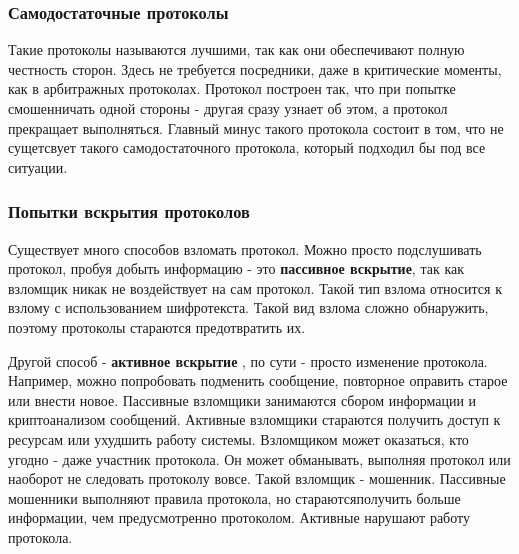 \documentclass[a4paper]{article}
\begin{document}
\subsubsection*{Самодостаточные протоколы}
Такие протоколы называются лучшими, так как они обеспечивают полную честность сторон. Здесь не требуется посредники, даже в критические моменты, как в арбитражных протоколах. Протокол построен так, что при попытке смошенничать одной стороны - другая сразу узнает об этом, а протокол прекращает выполняться.
Главный минус такого протокола состоит в том, что не сущетсвует такого самодостаточного протокола, который подходил бы под все ситуации. 
\subsubsection*{Попытки вскрытия протоколов}
Существует много способов взломать протокол. Можно просто подслушивать протокол, пробуя добыть информацию - это \textbf{пассивное вскрытие}, так как взломщик никак не воздействует на сам протокол.
Такой тип взлома относится к взлому с использованием шифротекста. Такой вид взлома сложно обнаружить, поэтому протоколы стараются предотвратить их.

Другой способ - \textbf{активное вскрытие }, по сути - просто изменение протокола. Например, можно попробовать подменить сообщение, повторное оправить старое или внести новое.
Пассивные взломщики занимаются сбором информации и криптоанализом сообщений. Активные взломщики стараются получить доступ к ресурсам или ухудшить работу системы.
Взломщиком может оказаться, кто угодно - даже участник протокола. Он может обманывать, выполняя протокол или наоборот не следовать протоколу вовсе. Такой взломщик - мошенник. Пассивные мошенники выполняют правила протокола, но стараютсяполучить больше информации, чем предусмотренно протоколом.
Активные нарушают работу протокола.
\end{document}
